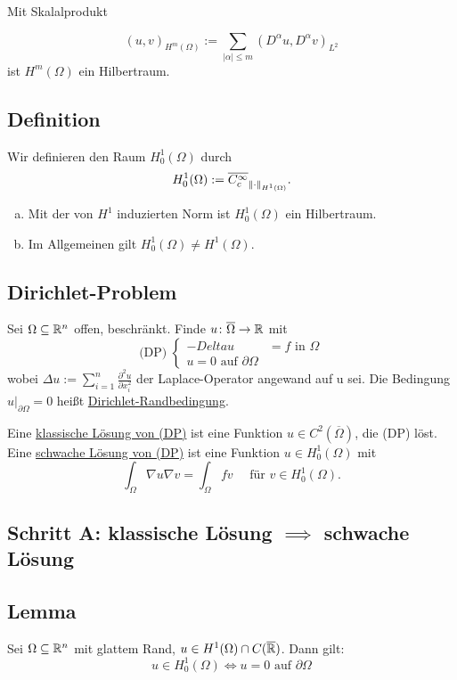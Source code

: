 Mit Skalalprodukt

$$
(u,v)_{H^m(\Omega)} := \sum_{|\alpha| \leq m} (D^\alpha u, D^\alpha v)_{L^2}
$$
ist $H^m(\Omega)$ ein Hilbertraum.

\subsection{Definition}
Wir definieren den Raum $H_0^1(\Omega)$ durch $$H_0^1(\Omega) := \overline{C_c^\infty}_{\lVert \cdot \rVert_{H^1(\Omega)}}.$$

\begin{bem}
  \begin{enumerate}[a)]
    \item Mit der von $H^1$ induzierten Norm ist $H_0^1(\Omega)$ ein Hilbertraum.
    \item Im Allgemeinen gilt $H_0^1(\Omega) \neq H^1(\Omega)$.
  \end{enumerate}
\end{bem}

\subsection{Dirichlet-Problem}

Sei $\Omega \subseteq \mathbb{R}^n$ offen, beschränkt. Finde $u \colon \overline\Omega \to \mathbb{R}$ mit
$$
\text{(DP)}\; \begin{cases}
  -Delta u &= f \text{ in } \Omega \\
  u = 0 \text{ auf } \partial\Omega
\end{cases}
$$
wobei $\Delta u := \sum_{i = 1}^n \frac{\partial^2 u}{\partial x_i^2}$ der Laplace-Operator angewand auf u sei. 
Die Bedingung $u|_{\partial \Omega} = 0$ heißt \underline{Dirichlet-Randbedingung}.

\begin{ntion}
  Eine \underline{klassische Lösung von (DP)} ist eine Funktion $u \in C^2(\overline\Omega)$, die (DP) löst.
  Eine \underline{schwache Lösung von (DP)} ist eine Funktion $u \in H_0^1(\Omega)$ mit
  $$
  \int_\Omega \nabla u \nabla v = \int_\Omega fv \quad\text{ für } v \in H_0^1(\Omega).
  $$
\end{ntion}

\subsection*{Schritt A: klassische Lösung $\implies$ schwache Lösung}
\subsection{Lemma}
Sei $\Omega \subseteq \mathbb{R}^n$ mit glattem Rand, $u \in H^1(\Omega) \cap C(\overline{\mathbb{R}})$.
Dann gilt:
$$
u \in H_0^1(\Omega) \iff u = 0 \text{ auf } \partial\Omega
$$

